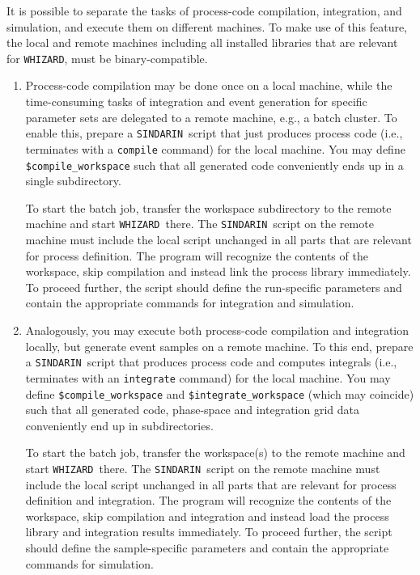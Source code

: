 \documentclass[12pt]{book}
\newcommand{\ttt}[1]{\texttt{#1}}
\newcommand{\whizard}{\ttt{WHIZARD}}
\newcommand{\sindarin}{\ttt{SINDARIN}}
\begin{document}
It is possible to separate the tasks of process-code compilation, integration,
and simulation, and execute them on different machines.  To make use of
this feature, the local and remote machines including all
installed libraries that are relevant for \whizard, must be
binary-compatible.
\begin{enumerate}
\item
  Process-code compilation may be done once on a local machine, while the
  time-consuming tasks of integration and event generation for specific
  parameter sets are delegated to a remote machine, e.g., a batch cluster.  To
  enable this, prepare a \sindarin\ script that just produces process code
  (i.e., terminates with a \ttt{compile} command) for the local machine.  You
  may define \ttt{\$compile\_workspace} such that all generated code
  conveniently ends up in a single subdirectory.

  To start the batch job, transfer the workspace subdirectory to the remote
  machine
  and start \whizard\ there.  The \sindarin\ script on the remote machine must
  include the local script unchanged in all parts that are relevant for
  process definition.  The program will recognize the contents of the
  workspace, skip compilation and instead link the process library immediately.
  To proceed further, the script should define the run-specific parameters and
  contain the appropriate commands for integration and simulation.
\item
  Analogously, you may execute both process-code compilation and integration
  locally, but generate event samples on a remote machine.  To this end,
  prepare a \sindarin\ script that produces process code and computes integrals
  (i.e., terminates with an \ttt{integrate} command) for the local machine.
  You may define \ttt{\$compile\_workspace} and \ttt{\$integrate\_workspace}
  (which may coincide) such that all generated code, phase-space and
  integration grid data conveniently end up in subdirectories.

  To start the batch job, transfer the workspace(s) to the remote machine and
  start \whizard\ there.  The \sindarin\ script on the remote machine must
  include the local script unchanged in all parts that are relevant for
  process definition and integration.  The program will recognize the contents
  of the workspace, skip compilation and integration and instead load the
  process library and integration results immediately.  To proceed further,
  the script should define the sample-specific parameters and contain the
  appropriate commands for simulation.
\end{enumerate}
\end{document}
